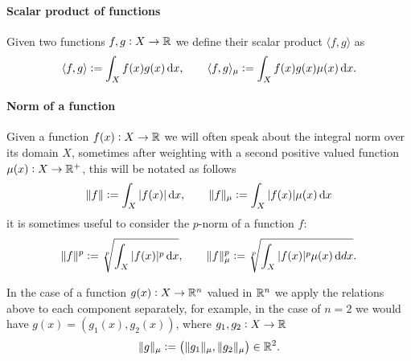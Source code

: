 \paragraph{Scalar product of functions}
Given two functions $f,g:X\to\mathbb{R}$ we define their scalar product
$\langle f, g \rangle$ as
\begin{displaymath}
\langle f, g \rangle := \int_X f(x)g(x) \mathop{}\!\mathrm{d} x, \qquad \langle f, g \rangle_\mu := \int_X f(x)g(x)\mu(x) \mathop{}\!\mathrm{d} x.
\end{displaymath}

\paragraph{Norm of a function}
Given a function $f(x): X\to\mathbb{R}$ we will often speak about the integral norm over its
domain $X$, sometimes after weighting with a second positive valued function
$\mu(x): X\to\mathbb{R}^+$, this will be notated as follows
\begin{displaymath}
\|f\| := \int_X |f(x)| \mathop{}\!\mathrm{d} x, \qquad \|f\|_\mu := \int_X |f(x)| \mu(x) \mathop{}\!\mathrm{d} x
\end{displaymath}
it is sometimes useful to consider the $p$-norm of a function $f$:
\begin{displaymath}
\|f\|^p := \sqrt[p]{\int_X |f(x)|^p \mathop{}\!\mathrm{d} x}, \qquad \|f\|_\mu^p := \sqrt[p]{\int_X |f(x)|^p \mu(x)\mathop{}\!\mathrm{d} dx}.
\end{displaymath}

In the case of a function $g(x): X\to\mathbb{R}^n$ valued in $\mathbb{R}^n$ we apply the
relations above to
each component separately, for example, in the case of $n = 2$ we would have
$g(x) = (g_1(x), g_2(x))$, where $g_1,g_2:X\to\mathbb{R}$
\begin{displaymath}
\|g\|_\mu := \left(\|g_1\|_\mu, \|g_2\|_\mu\right) \in \mathbb{R}^2.
\end{displaymath}
